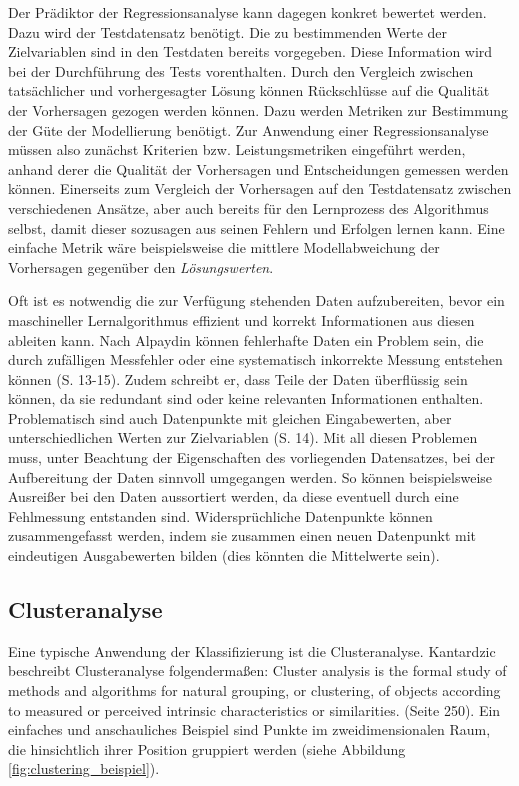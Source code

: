\documentclass[
	12pt,
	a4paper,
	BCOR10mm,
	DIV14,
	listof=totoc,
	bibliography=totoc,
	headsepline
]{scrreprt}
\begin{document}
Der Prädiktor der Regressionsanalyse kann dagegen konkret bewertet werden. Dazu wird der Testdatensatz benötigt. Die zu bestimmenden Werte der Zielvariablen sind in den Testdaten bereits vorgegeben.
Diese Information wird bei der Durchführung des Tests vorenthalten. Durch den Vergleich zwischen tatsächlicher und vorhergesagter Lösung können Rückschlüsse auf die Qualität der Vorhersagen gezogen werden können. Dazu werden Metriken zur Bestimmung der Güte der Modellierung benötigt.
Zur Anwendung einer Regressionsanalyse müssen also zunächst Kriterien bzw. Leistungsmetriken eingeführt werden, anhand derer die Qualität der Vorhersagen und Entscheidungen gemessen werden können. Einerseits zum Vergleich der Vorhersagen auf den Testdatensatz zwischen verschiedenen Ansätze, aber auch bereits für den Lernprozess des Algorithmus selbst, damit dieser sozusagen aus seinen Fehlern und Erfolgen lernen kann. Eine einfache Metrik wäre beispielsweise die mittlere Modellabweichung der Vorhersagen gegenüber den \textit{Lösungswerten}.
\medskip

Oft ist es notwendig die zur Verfügung stehenden Daten aufzubereiten, bevor ein maschineller Lernalgorithmus effizient und korrekt Informationen aus diesen ableiten kann.
Nach Alpaydin können fehlerhafte Daten ein Problem sein, die durch zufälligen Messfehler oder eine systematisch inkorrekte Messung entstehen können \cite{Alpaydin:2010:IML:1734076} (S. 13-15). Zudem schreibt er, dass Teile der Daten überflüssig sein können, da sie redundant sind oder keine relevanten Informationen enthalten. Problematisch sind auch Datenpunkte mit gleichen Eingabewerten, aber unterschiedlichen Werten zur Zielvariablen \cite{Alpaydin:2010:IML:1734076} (S. 14).
Mit all diesen Problemen muss, unter Beachtung der Eigenschaften des vorliegenden Datensatzes, bei der Aufbereitung der Daten sinnvoll umgegangen werden. So können beispielsweise Ausreißer bei den Daten aussortiert werden, da diese eventuell durch eine Fehlmessung entstanden sind. Widersprüchliche Datenpunkte können zusammengefasst werden, indem sie zusammen einen neuen Datenpunkt mit eindeutigen Ausgabewerten bilden (dies könnten die Mittelwerte sein).

\subsection{Clusteranalyse}
Eine typische Anwendung der Klassifizierung ist die Clusteranalyse.
Kantardzic beschreibt Clusteranalyse folgendermaßen: \glqq Cluster analysis is the formal study of methods and algorithms for natural grouping, or clustering, of objects according to measured or perceived intrinsic characteristics or similarities.\grqq{} \cite{kantardzic2011data} (Seite 250). Ein einfaches und anschauliches Beispiel sind Punkte im zweidimensionalen Raum, die hinsichtlich ihrer Position gruppiert werden (siehe Abbildung \ref{fig:clustering_beispiel}).
\end{document}
